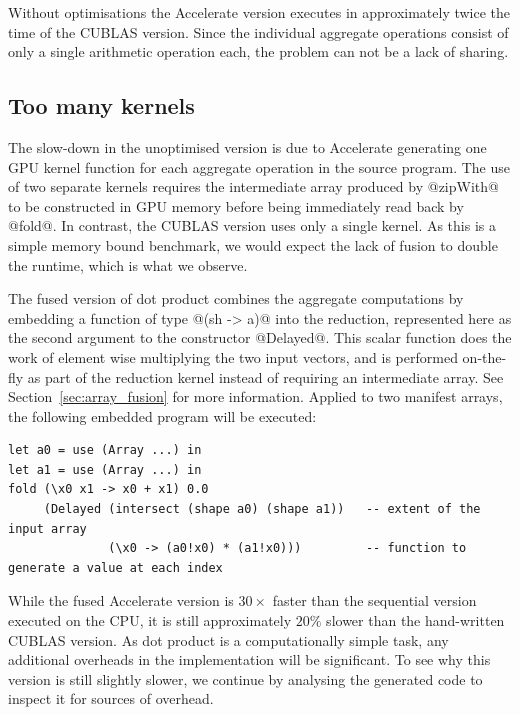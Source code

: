 Without optimisations the Accelerate version executes in approximately twice the
time of the CUBLAS version. Since the individual aggregate operations consist of
only a single arithmetic operation each, the problem can not be a lack of
sharing.


\subsection{Too many kernels}

The slow-down in the unoptimised version is due to Accelerate generating one GPU
kernel function for each aggregate operation in the source program. The use of
two separate kernels requires the intermediate array produced by @zipWith@ to be
constructed in GPU memory before being immediately read back by @fold@. In
contrast, the CUBLAS version uses only a single kernel. As this is a simple
memory bound benchmark, we would expect the lack of fusion to double the
runtime, which is what we observe.

The fused version of dot product combines the aggregate computations by
embedding a function of type @(sh -> a)@ into the reduction, represented
here as the second argument to the constructor @Delayed@. This scalar
function does the work of element wise multiplying the two input vectors, and is
performed on-the-fly as part of the reduction kernel instead of requiring an
intermediate array. See Section~\ref{sec:array_fusion} for more information.
Applied to two manifest arrays, the following embedded program will be executed:

\begin{lstlisting}[style=haskell]
let a0 = use (Array ...) in
let a1 = use (Array ...) in
fold (\x0 x1 -> x0 + x1) 0.0
     (Delayed (intersect (shape a0) (shape a1))   -- extent of the input array
              (\x0 -> (a0!x0) * (a1!x0)))         -- function to generate a value at each index
\end{lstlisting}

While the fused Accelerate version is $30\times$ faster than the sequential
version executed on the CPU, it is still approximately $20\%$ slower than the
hand-written CUBLAS version. As dot product is a computationally simple task,
any additional overheads in the implementation will be significant. To see why
this version is still slightly slower, we continue by analysing the generated
code to inspect it for sources of overhead.


